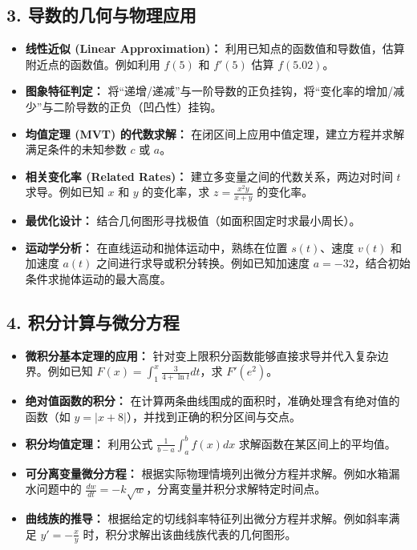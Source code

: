 \documentclass[12pt,a4paper]{article}
\begin{document}
\subsection*{3. 导数的几何与物理应用}
\begin{itemize}
    \item \textbf{线性近似 (Linear Approximation)：} 利用已知点的函数值和导数值，估算附近点的函数值。例如利用 $f(5)$ 和 $f'(5)$ 估算 $f(5.02)$。
    \item \textbf{图象特征判定：} 将“递增/递减”与一阶导数的正负挂钩，将“变化率的增加/减少”与二阶导数的正负（凹凸性）挂钩。
    \item \textbf{均值定理 (MVT) 的代数求解：} 在闭区间上应用中值定理，建立方程并求解满足条件的未知参数 $c$ 或 $a$。
    \item \textbf{相关变化率 (Related Rates)：} 建立多变量之间的代数关系，两边对时间 $t$ 求导。例如已知 $x$ 和 $y$ 的变化率，求 $z = \frac{x^2y}{x+y}$ 的变化率。
    \item \textbf{最优化设计：} 结合几何图形寻找极值（如面积固定时求最小周长）。
    \item \textbf{运动学分析：} 在直线运动和抛体运动中，熟练在位置 $s(t)$、速度 $v(t)$ 和加速度 $a(t)$ 之间进行求导或积分转换。例如已知加速度 $a = -32$，结合初始条件求抛体运动的最大高度。
\end{itemize}

\subsection*{4. 积分计算与微分方程}
\begin{itemize}
    \item \textbf{微积分基本定理的应用：} 针对变上限积分函数能够直接求导并代入复杂边界。例如已知 $F(x) = \int_{1}^{x} \frac{3}{4+\ln t} dt$，求 $F'(e^2)$。
    \item \textbf{绝对值函数的积分：} 在计算两条曲线围成的面积时，准确处理含有绝对值的函数（如 $y = |x+8|$），并找到正确的积分区间与交点。
    \item \textbf{积分均值定理：} 利用公式 $\frac{1}{b-a} \int_{a}^{b} f(x) dx$ 求解函数在某区间上的平均值。
    \item \textbf{可分离变量微分方程：} 根据实际物理情境列出微分方程并求解。例如水箱漏水问题中的 $\frac{dw}{dt} = -k\sqrt{w}$，分离变量并积分求解特定时间点。
    \item \textbf{曲线族的推导：} 根据给定的切线斜率特征列出微分方程并求解。例如斜率满足 $y' = -\frac{x}{y}$ 时，积分求解出该曲线族代表的几何图形。
\end{itemize}
\end{document}
